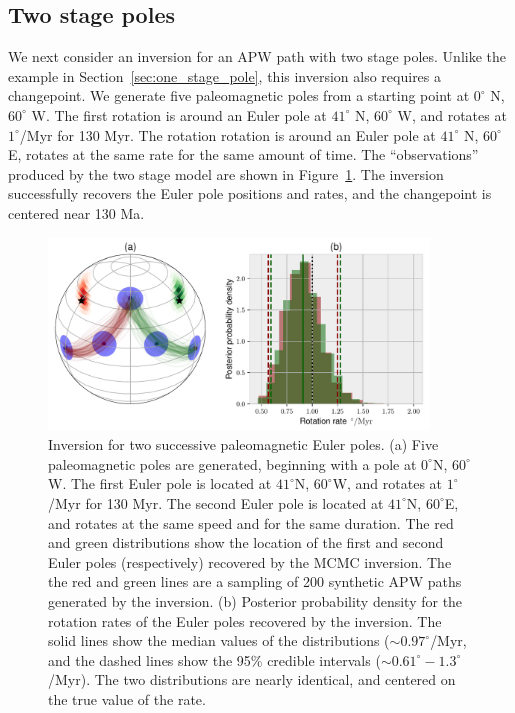 \documentclass[preprint,12pt,authoryear]{elsarticle}
\begin{document}
\subsection{Two stage poles}
\label{sec:two_stage_poles}
We next consider an inversion for an APW path with two stage poles.
Unlike the example in Section~\ref{sec:one_stage_pole}, this inversion also requires a changepoint.
We generate five paleomagnetic poles from a starting point at $0^\circ$ N, $60^\circ$ W.
The first rotation is around an Euler pole at $41^\circ$ N, $60^\circ$ W, and rotates at $1^\circ$/Myr for 130 Myr.
The rotation rotation is around an Euler pole at $41^\circ$ N, $60^\circ$ E, rotates at the same rate for the same amount of time.
The ``observations'' produced by the two stage model are shown in Figure~\ref{fig:two_euler_poles}.
The inversion successfully recovers the Euler pole positions and rates, and the changepoint is centered near 130 Ma.
\begin{figure}
\includegraphics[width=0.9\textwidth]{figures/synthetic/two_euler_poles.pdf}
\caption[Inversion for two successive paleomagnetic Euler poles.]{Inversion for two successive paleomagnetic Euler poles. (a) Five paleomagnetic poles are generated, beginning with a pole at $0^\circ$N, $60^\circ$W. The first Euler pole is located at $41^\circ$N, $60^\circ$W, and rotates at $1^\circ$/Myr for 130 Myr. The second Euler pole is located at $41^\circ$N, $60^\circ$E, and rotates at the same speed and for the same duration. The red and green distributions show the location of the first and second Euler poles (respectively) recovered by the MCMC inversion. The the red and green lines are a sampling of 200 synthetic APW paths generated by the inversion. (b) Posterior probability density for the rotation rates of the Euler poles recovered by the inversion. The solid lines show the median values of the distributions ($\sim 0.97^\circ$/Myr, and the dashed lines show the 95\% credible intervals ($\sim 0.61^\circ-1.3^\circ$/Myr). The two distributions are nearly identical, and centered on the true value of the rate.}
\label{fig:two_euler_poles}
\end{figure}
\end{document}
